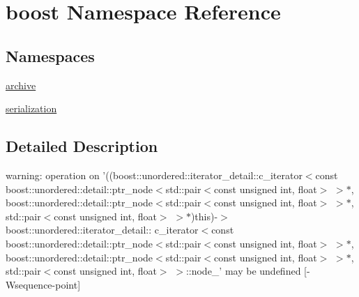 \hypertarget{namespaceboost}{\section{boost Namespace Reference}
\label{namespaceboost}
}
\subsection*{Namespaces}
\begin{DoxyCompactItemize}
\item 
\hyperlink{namespaceboost_1_1archive}{archive}
\item 
\hyperlink{namespaceboost_1_1serialization}{serialization}
\end{DoxyCompactItemize}


\subsection{Detailed Description}
warning\-: operation on '((boost\-::unordered\-::iterator\-\_\-detail\-::c\-\_\-iterator$<$const boost\-::unordered\-::detail\-::ptr\-\_\-node$<$std\-::pair$<$const unsigned int, float$>$ $>$$\ast$, boost\-::unordered\-::detail\-::ptr\-\_\-node$<$std\-::pair$<$const unsigned int, float$>$ $>$$\ast$, std\-::pair$<$const unsigned int, float$>$ $>$$\ast$)this)-\/$>$boost\-::unordered\-::iterator\-\_\-detail\-:\-: c\-\_\-iterator$<$const boost\-::unordered\-::detail\-::ptr\-\_\-node$<$std\-::pair$<$const unsigned int, float$>$ $>$$\ast$, boost\-::unordered\-::detail\-::ptr\-\_\-node$<$std\-::pair$<$const unsigned int, float$>$ $>$$\ast$, std\-::pair$<$const unsigned int, float$>$ $>$\-::node\-\_\-' may be undefined \mbox{[}-\/\-Wsequence-\/point\mbox{]} 